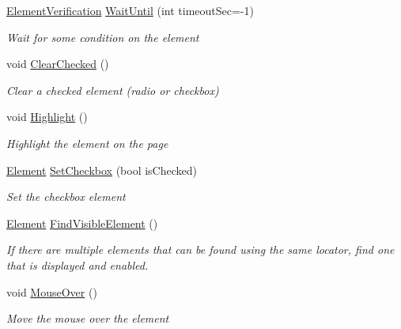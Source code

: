 \begin{DoxyCompactItemize}
\hyperlink{class_proto_test_1_1_golem_1_1_web_driver_1_1_element_verification}{Element\-Verification} \hyperlink{class_proto_test_1_1_golem_1_1_web_driver_1_1_element_a58c95f30b4c82eae0708d01d4a60e1fc}{Wait\-Until} (int timeout\-Sec=-\/1)
\begin{DoxyCompactList}\small\item\em Wait for some condition on the element \end{DoxyCompactList}\item 
void \hyperlink{class_proto_test_1_1_golem_1_1_web_driver_1_1_element_abb6dc27bc4c56c202f91288bb4b0d2ba}{Clear\-Checked} ()
\begin{DoxyCompactList}\small\item\em Clear a checked element (radio or checkbox) \end{DoxyCompactList}\item 
void \hyperlink{class_proto_test_1_1_golem_1_1_web_driver_1_1_element_a439591ece590bc0e7d6eb71fbb45c5dd}{Highlight} ()
\begin{DoxyCompactList}\small\item\em Highlight the element on the page \end{DoxyCompactList}\item 
\hyperlink{class_proto_test_1_1_golem_1_1_web_driver_1_1_element}{Element} \hyperlink{class_proto_test_1_1_golem_1_1_web_driver_1_1_element_ad63d92124e0937164fd83a5b6bcd358c}{Set\-Checkbox} (bool is\-Checked)
\begin{DoxyCompactList}\small\item\em Set the checkbox element \end{DoxyCompactList}\item 
\hyperlink{class_proto_test_1_1_golem_1_1_web_driver_1_1_element}{Element} \hyperlink{class_proto_test_1_1_golem_1_1_web_driver_1_1_element_a9de73505796e421f1d9531406b4ae124}{Find\-Visible\-Element} ()
\begin{DoxyCompactList}\small\item\em If there are multiple elements that can be found using the same locator, find one that is displayed and enabled. \end{DoxyCompactList}\item 
void \hyperlink{class_proto_test_1_1_golem_1_1_web_driver_1_1_element_aefa360b37e897c68ac96c512dc29f4ec}{Mouse\-Over} ()
\begin{DoxyCompactList}\small\item\em Move the mouse over the element \end{DoxyCompactList}\end{DoxyCompactItemize}
